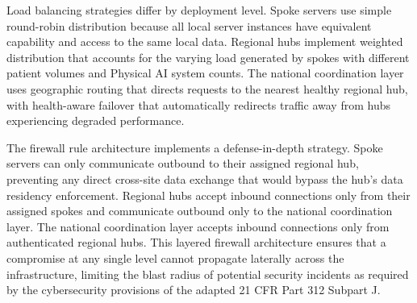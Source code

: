 Load balancing strategies differ by deployment level. Spoke servers use simple
round-robin distribution because all local server instances have equivalent
capability and access to the same local data. Regional hubs implement weighted
distribution that accounts for the varying load generated by spokes with
different patient volumes and Physical AI system counts. The national
coordination layer uses geographic routing that directs requests to the nearest
healthy regional hub, with health-aware failover that automatically redirects
traffic away from hubs experiencing degraded performance.

The firewall rule architecture implements a defense-in-depth strategy. Spoke
servers can only communicate outbound to their assigned regional hub, preventing
any direct cross-site data exchange that would bypass the hub's data residency
enforcement. Regional hubs accept inbound connections only from their assigned
spokes and communicate outbound only to the national coordination layer. The
national coordination layer accepts inbound connections only from authenticated
regional hubs. This layered firewall architecture ensures that a compromise at
any single level cannot propagate laterally across the infrastructure, limiting
the blast radius of potential security incidents as required by the
cybersecurity provisions of the adapted 21 CFR Part 312 \cite{cfr312-adapt}
Subpart J.
